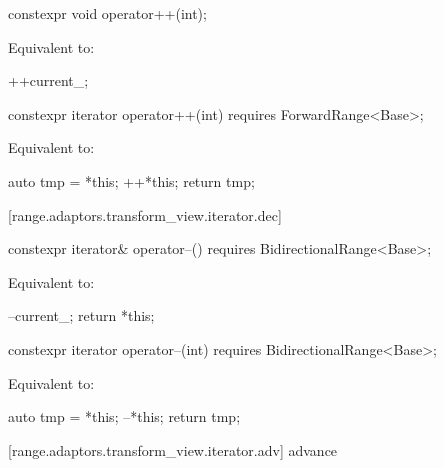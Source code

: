 \begin{addedblock}
\begin{itemdecl}
constexpr void operator++(int);
\end{itemdecl}

\begin{itemdescr}
\pnum
\effects Equivalent to:
\begin{codeblock}
++current_;
\end{codeblock}
\end{itemdescr}

\begin{itemdecl}
constexpr iterator operator++(int) requires ForwardRange<Base>;
\end{itemdecl}

\begin{itemdescr}
\pnum
\effects Equivalent to:
\begin{codeblock}
auto tmp = *this;
++*this;
return tmp;
\end{codeblock}
\end{itemdescr}

[range.adaptors.transform_view.iterator.dec]{}

\begin{itemdecl}
constexpr iterator& operator--() requires BidirectionalRange<Base>;
\end{itemdecl}

\begin{itemdescr}
\pnum
\effects Equivalent to:
\begin{codeblock}
--current_;
return *this;
\end{codeblock}
\end{itemdescr}

\begin{itemdecl}
constexpr iterator operator--(int) requires BidirectionalRange<Base>;
\end{itemdecl}

\begin{itemdescr}
\pnum
\effects Equivalent to:
\begin{codeblock}
auto tmp = *this;
--*this;
return tmp;
\end{codeblock}
\end{itemdescr}

[range.adaptors.transform_view.iterator.adv]{ advance}


\end{addedblock}
